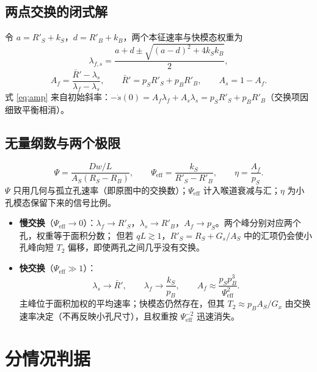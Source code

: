 \documentclass[11pt,a4paper]{article}
\newcommand{\Peff}{\Psi_{\mathrm{eff}}}
\begin{document}
\subsection{两点交换的闭式解}
令 $a=R'_S+k_S$，$d=R'_B+k_B$，两个本征速率与快模态权重为
\begin{equation}
\lambda_{f,s}=\frac{a+d\pm\sqrt{(a-d)^2+4k_Sk_B}}{2},
\label{eq:lam}
\end{equation}
\begin{equation}
A_f=\frac{\bar R'-\lambda_s}{\lambda_f-\lambda_s},\qquad \bar R'=p_SR'_S+p_BR'_B,\qquad A_s=1-A_f .
\label{eq:amp}
\end{equation}
式 \eqref{eq:amp} 来自初始斜率：$-\dot s(0)=A_f\lambda_f+A_s\lambda_s=p_SR'_S+p_BR'_B$（交换项因细致平衡相消）。

\subsection{无量纲数与两个极限}
\begin{equation}
\Psi=\frac{Dw/L}{A_S(R_S-R_B)},\qquad
\Peff=\frac{k_S}{R'_S-R'_B},\qquad
\eta=\frac{A_f}{p_S}.
\end{equation}
$\Psi$ 只用几何与孤立孔速率（即原图中的交换数）；$\Peff$ 计入喉道衰减与汇；$\eta$ 为小孔模态保留下来的信号比例。
\begin{itemize}[leftmargin=2em]
\item \textbf{慢交换}（$\Peff\to0$）：$\lambda_f\to R'_S$，$\lambda_s\to R'_B$，$A_f\to p_S$。两个峰分别对应两个孔，权重等于面积分数；
但若 $qL\gtrsim1$，$R'_S=R_S+G_s/A_S$ 中的汇项仍会使小孔峰向短 $T_2$ 偏移，即使两孔之间几乎没有交换。
\item \textbf{快交换}（$\Peff\gg1$）：
\begin{equation}
\lambda_s\to\bar R',\qquad \lambda_f\to\frac{k_S}{p_B},\qquad A_f\approx\frac{p_Sp_B^3}{\Peff^{2}} .
\label{eq:fast}
\end{equation}
主峰位于面积加权的平均速率；快模态仍然存在，但其 $T_2\approx p_BA_S/G_x$ 由交换速率决定（不再反映小孔尺寸），且权重按 $\Peff^{-2}$ 迅速消失。
\end{itemize}

\section{分情况判据}
\end{document}
